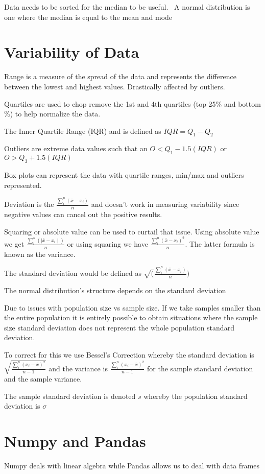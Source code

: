 \documentclass{article}
\begin{document}
Data needs to be sorted for the median to be useful.
\
A normal distribution is one where the median is equal to the mean and mode

\section{Variability of Data}

Range is a measure of the spread of the data and represents the difference
between the lowest and highest values. Drastically affected by outliers.

Quartiles are used to chop remove the 1st and 4th quartiles (top 25\% and
bottom \%) to help normalize the data.

The Inner Quartile Range (IQR) and is defined as $IQR = Q_1 - Q_2$

Outliers are extreme data values such that an $O < Q_1 - 1.5(IQR)$ or $O > Q_3
+ 1.5(IQR)$

Box plots can represent the data with quartile ranges, min/max and outliers
represented.

Deviation is the $\frac{\sum_i^n(\bar{x} - x_i)}{n}$ and doesn't work in
measuring variability since negative values can cancel out the positive results.

Squaring or absolute value can be used to curtail that issue. Using absolute
value we get $\frac{\sum_i^n(\mid \bar{x} - x_i\mid)}{n}$ or using squaring we
have $\frac{\sum_i^n(\bar{x} - x_i)^2}{n}$. The latter formula is known as the
variance.

The standard deviation would be defined as
$\sqrt(\frac{\sum_i^n(\bar{x} - x_i)}{n})$

The normal distribution's structure depends on the
standard deviation

Due to issues with population size vs sample size. If we take samples
smaller than the entire population it is entirely possible to obtain situations
where the sample size standard deviation does not represent the whole population
standard deviation.

To correct for this we use Bessel's Correction whereby the standard deviation is
$\sqrt{\frac{\sum_i^n(x_i - \bar{x})^2}{n - 1}}$ and the variance is
$\frac{\sum_i^n(x_i - \bar{x})^2}{n - 1}$ for the sample standard deviation
and the sample variance.

The sample standard deviation is denoted $s$ whereby the population standard
deviation is $\sigma$

\section{Numpy and Pandas}
Numpy deals with linear algebra while Pandas allows us to deal with data frames
\end{document}
